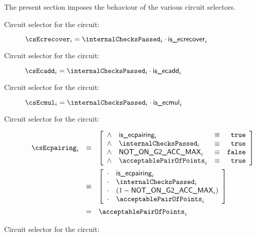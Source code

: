 The present section imposes the behaviour of the various circuit selectors.
\begin{description}
    \item[Circuit selector for the  circuit:]
        $\csEcrecover_{i} = \internalChecksPassed_{i} \cdot \locIsEcrecover_{i}$
    \item[Circuit selector for the  circuit:]
        $\csEcadd_{i} = \internalChecksPassed_{i} \cdot \locIsEcadd_{i}$
    \item[Circuit selector for the  circuit:]
        $\csEcmul_{i} = \internalChecksPassed_{i} \cdot \locIsEcmul_{i}$
    \item[Circuit selector for the  circuit:]
        \[
            \begin{array}{lcl}
                \csEcpairing_{i} & \equiv &
                \left[ \begin{array}{clcr}
                    \wedge & \locIsEcpairing_{i}         & \equiv & \texttt{true}  \\
                    \wedge & \internalChecksPassed_{i}   & \equiv & \texttt{true}  \\
                    \wedge & \notOnGTwoAccMax_{i}        & \equiv & \texttt{false} \\
                    \wedge & \acceptablePairOfPoints_{i} & \equiv & \texttt{true}  \\
                \end{array} \right] \vspace{2mm} \\
                & \equiv & 
                \left[ \begin{array}{clcr}
                    \cdot & \locIsEcpairing_{i}         \\
                    \cdot & \internalChecksPassed_{i}   \\
                    \cdot & (1 - \notOnGTwoAccMax_{i})  \\
                    \cdot & \acceptablePairOfPoints_{i} \\
                \end{array} \right] \vspace{2mm} \\
                & =      & \acceptablePairOfPoints_{i} \\
            \end{array}
        \]
    \item[Circuit selector for the  circuit:]

\end{description}
